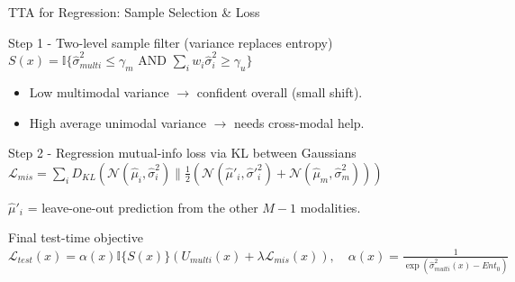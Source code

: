 \documentclass[aspectratio=169]{beamer}
\begin{document}
	\begin{frame}{TTA for Regression: Sample Selection \& Loss}
		\begin{block}{Step 1 - Two-level sample filter (variance replaces entropy)}
			\vspace{0.2em}
			\centering
			$S(x) = \mathbb{I}\{ \hat{\sigma}^2_{multi} \leq \gamma_m \text{ AND } \sum_i w_i \hat{\sigma}^2_i \geq \gamma_u \}$
			\smallskip
			\begin{itemize}
				\item Low multimodal variance $\to$ confident overall (small shift).
				\item High average unimodal variance $\to$ needs cross-modal help.
			\end{itemize}
		\end{block}
		\vspace{0.3em}
		\begin{block}{Step 2 - Regression mutual-info loss via KL between Gaussians}
			\vspace{0.2em}
			\centering
			$\mathcal{L}_{mis} = \sum_i D_{KL}(\mathcal{N}(\hat{\mu}_i, \hat{\sigma}_i^2) \| \frac{1}{2} (\mathcal{N}(\hat{\mu}'_i, \hat{\sigma}'^2_i) + \mathcal{N}(\hat{\mu}_m, \hat{\sigma}^2_m)))$
			\smallskip
			
			\raggedright\small $\hat{\mu}'_i$ = leave-one-out prediction from the other $M-1$ modalities.
		\end{block}
		\vspace{0.3em}
		\begin{block}{Final test-time objective}
			\vspace{0.2em}
			\centering
			$\mathcal{L}_{test}(x) = \alpha(x) \mathbb{I}\{S(x)\} (U_{multi}(x) + \lambda \mathcal{L}_{mis}(x)), \quad \alpha(x) = \frac{1}{\exp(\hat{\sigma}^2_{multi}(x) - Ent_0)}$
		\end{block}
	\end{frame}
	
\end{document}
